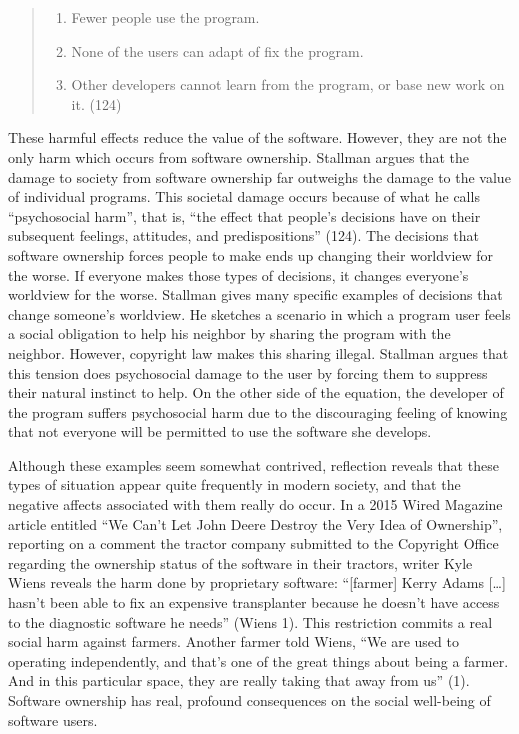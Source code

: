 \documentclass[titlepage]{article}
\begin{document}
\begin{quote}
\begin{enumerate}
\def\labelenumi{\arabic{enumi}.}
\item
  Fewer people use the program.
\item
  None of the users can adapt of fix the program.
\item
  Other developers cannot learn from the program, or base new work on
  it. (124)
\end{enumerate}
\end{quote}

These harmful effects reduce the value of the software. However, they
are not the only harm which occurs from software ownership. Stallman
argues that the damage to society from software ownership far outweighs
the damage to the value of individual programs. This societal damage
occurs because of what he calls ``psychosocial harm'', that is, ``the
effect that people's decisions have on their subsequent feelings,
attitudes, and predispositions'' (124). The decisions that software
ownership forces people to make ends up changing their worldview for the
worse. If everyone makes those types of decisions, it changes everyone's
worldview for the worse. Stallman gives many specific examples of
decisions that change someone's worldview. He sketches a scenario in
which a program user feels a social obligation to help his neighbor by
sharing the program with the neighbor. However, copyright law makes this
sharing illegal. Stallman argues that this tension does psychosocial
damage to the user by forcing them to suppress their natural instinct to
help. On the other side of the equation, the developer of the program
suffers psychosocial harm due to the discouraging feeling of knowing
that not everyone will be permitted to use the software she develops.

Although these examples seem somewhat contrived, reflection reveals that
these types of situation appear quite frequently in modern society, and
that the negative affects associated with them really do occur. In a
2015 Wired Magazine article entitled ``We Can't Let John Deere Destroy
the Very Idea of Ownership'', reporting on a comment the tractor company
submitted to the Copyright Office regarding the ownership status of the
software in their tractors, writer Kyle Wiens reveals the harm done by
proprietary software: ``{[}farmer{]} Kerry Adams {[}\ldots{}{]} hasn't
been able to fix an expensive transplanter because he doesn't have
access to the diagnostic software he needs'' (Wiens 1). This restriction
commits a real social harm against farmers. Another farmer told Wiens,
``We are used to operating independently, and that's one of the great
things about being a farmer. And in this particular space, they are
really taking that away from us'' (1). Software ownership has real,
profound consequences on the social well-being of software users.
\end{document}
